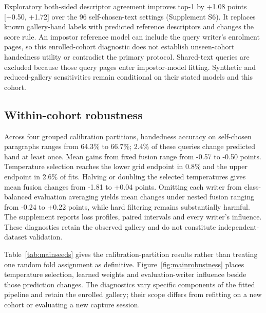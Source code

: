 Exploratory both-sided descriptor agreement improves top-1 by +1.08 points [+0.50, +1.72] over the 96 self-chosen-text settings (Supplement S6). It replaces known gallery-hand labels with predicted reference descriptors and changes the score rule. An impostor reference model can include the query writer's enrolment pages, so this enrolled-cohort diagnostic does not establish unseen-cohort handedness utility or contradict the primary protocol. Shared-text queries are excluded because those query pages enter impostor-model fitting. Synthetic and reduced-gallery sensitivities remain conditional on their stated models and this cohort.

\subsection{Within-cohort robustness}
Across four grouped calibration partitions, handedness accuracy on self-chosen paragraphs ranges from 64.3\% to 66.7\%; 2.4\% of these queries change predicted hand at least once. Mean gains from fixed fusion range from -0.57 to -0.50 points. Temperature selection reaches the lower grid endpoint in 0.8\% and the upper endpoint in 2.6\% of fits. Halving or doubling the selected temperatures gives mean fusion changes from -1.81 to +0.04 points. Omitting each writer from class-balanced evaluation averaging yields mean changes under nested fusion ranging from -0.24 to +0.22 points, while hard filtering remains substantially harmful. The supplement reports loss profiles, paired intervals and every writer's influence. These diagnostics retain the observed gallery and do not constitute independent-dataset validation.

Table~\ref{tab:mainseeds} gives the calibration-partition results rather than treating one random fold assignment as definitive. Figure~\ref{fig:mainrobustness} places temperature selection, learned weights and evaluation-writer influence beside those prediction changes. The diagnostics vary specific components of the fitted pipeline and retain the enrolled gallery; their scope differs from refitting on a new cohort or evaluating a new capture session.

